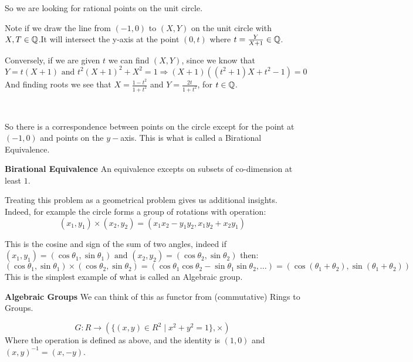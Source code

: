 \begin{enumerate}
    So we are looking for rational points on the unit circle.
    
    Note if we draw the line from $(-1,0)$ to $(X,Y)$ on the unit circle with $X,T\in \mathbb{Q}$.It will intersect the y-axis at the point $(0,t)$ where $t=\frac{Y}{X+1}\in \mathbb{Q}$.
    
    Conversely, if we are given $t$ we can find $(X,Y)$, since we know that\begin{equation*}
        Y=t(X+1) \text{ and }t^2{(X+1)}^2 + X^2 = 1 \Rightarrow (X+1)((t^2+1)X+t^2-1) = 0
    \end{equation*}
    And finding roots we see that $X = \frac{1-t^2}{1+t^2}$ and $Y=\frac{2t}{1+t^2}$, for $t\in \mathbb{Q}$.
    
    \
    
    So there is a correspondence between points on the circle except for the point at $(-1,0)$ and points on the $y-$axis. This is what is called a Birational Equivalence.
    
    \begin{definition}
        \textbf{Birational Equivalence}
        An equivalence excepts on subsets of co-dimension at least $1$.
    \end{definition}
\end{enumerate}
Treating this problem as a geometrical problem gives us additional insights. Indeed, for example the circle forms a group of rotations with operation:\begin{equation}
    (x_1,y_1)\times (x_2,y_2) = (x_1x_2-y_1y_2,x_1y_2+x_2y_1)
\end{equation}

This is the cosine and sign of the sum of two angles, indeed if $(x_1,y_1) = (\cos\theta_1,\sin\theta_1)\text{ and }(x_2,y_2) = (\cos\theta_2,\sin\theta_2)$ then:\begin{equation}
 (\cos\theta_1,\sin\theta_1)\times (\cos\theta_2,\sin\theta_2) = (\cos\theta_1\cos\theta_2-\sin\theta_1\sin\theta_2, \dots) = (\cos(\theta_1+\theta_2),\sin(\theta_1+\theta_2))
\end{equation}
This is the simplest example of what is called an Algebraic group.

\begin{definition}
    \textbf{Algebraic Groups} We can think of this as functor from (commutative) Rings to Groups.

    \begin{equation}
        G\colon R\rightarrow (\{(x,y)\in R^2\mid x^2+y^2=1\},\times)
     \end{equation}
     Where the operation is defined as above, and the identity is $(1,0)$ and ${(x,y)}^{-1} = (x,-y)$.
     
\end{definition}

